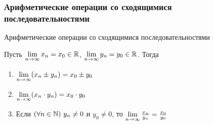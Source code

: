 \subsubsection*{Арифметические операции со сходящимися последовательностями}

\begin{theorem}
    Арифметические операции со сходящимися последовательностями
\end{theorem}

Пусть $\lim\limits_{n \to \infty} x_n = x_0 \in \mathbb{R}$,
$\lim\limits_{n \to \infty} y_n = y_0 \in \mathbb{R}$. Тогда

\begin{enumerate}
	\item $\lim\limits_{n \to \infty} (x_n \pm y_n) = x_0 \pm y_0$
	\item $\lim\limits_{n \to \infty} (x_n \cdot y_n) = x_0 \cdot y_0$
	\item Если $(\forall n \in \mathbb{N})\ y_n \neq 0$ и $y_0 \neq 0$, то $\lim\limits_{n \to \infty} \frac{x_n}{y_n} = \frac{x_0}{y_0}$
\end{enumerate}

